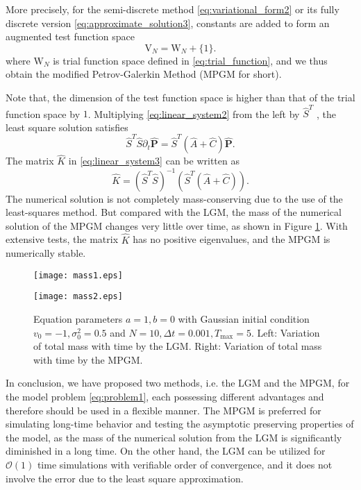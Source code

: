 More precisely,  for the semi-discrete method \eqref{eq:variational_form2} or its fully discrete version \eqref{eq:approximate_solution3}, constants are added to  form an augmented test function space
\begin{equation}
    \mathrm{V}_N=\mathrm{W}_N +\{1\}.
\end{equation}
where $\mathrm{W}_N$ is trial function space defined in \eqref{eq:trial_function}, and we thus obtain the modified Petrov-Galerkin Method (MPGM for short).

Note that, the dimension of the test function space is higher than that of the trial function space by $1$. Multiplying \eqref{eq:linear_system2} from the left by $\hat{S}^T$ , the least square solution satisfies
\begin{equation}
    \hat{S}^T\hat{S}\partial_t \hat{\mathbf{P}}=\hat{S}^T(\hat{A}+\hat{C})\hat{\mathbf{P}}.
\end{equation}
The matrix $\hat{K}$ in \eqref{eq:linear_system3} can be written as
\begin{equation}
    \hat{K}=(\hat{S}^T\hat{S})^{-1}(\hat{S}^T(\hat{A}+\hat{C})).
\end{equation}
The numerical solution is not completely mass-conserving due to the use of the least-squares method. But compared with the LGM, the mass of the numerical solution of the MPGM changes very little over time, as shown in Figure \ref{mass}. With extensive tests, the matrix $\hat{K}$ has no positive eigenvalues, and the MPGM is numerically stable.
\begin{figure}[!htb]
    \centering
        \begin{minipage}[c]{0.49\textwidth}
            \centering
            \texttt{[image: mass1.eps]}
        \end{minipage}
        \begin{minipage}[c]{0.49\textwidth}
            \centering
            \texttt{[image: mass2.eps]}
        \end{minipage}
        \caption{Equation parameters $a=1, b=0$ with Gaussian initial condition $v_0=-1, \sigma_0^2=0.5$ and $N=10,\Delta t=0.001,T_\text{max}=5$. Left: Variation of total mass with time by the LGM. Right: Variation of total mass with time by the MPGM.}
        \label{mass}
\end{figure}



In conclusion, we have proposed two methods, i.e. the LGM and the MPGM, for the model problem \eqref{eq:problem1},  each possessing different advantages and therefore should be used in a flexible manner. The MPGM is preferred for simulating long-time behavior and testing the asymptotic preserving properties of the model, as the mass of the numerical solution from the LGM is significantly diminished in a long time. On the other hand, the LGM can be utilized for $\mathcal O(1)$ time simulations with verifiable order of convergence, and it does not involve the error due to the least square approximation.




